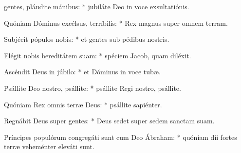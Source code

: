 \begin{psalmus}
    
     gentes, pláudite mánibus: * jubiláte Deo in voce exsultatiónis.
    
    Quóniam Dóminus excélsus, terríbilis: * Rex magnus super omnem terram.
    
    Subjécit pópulos nobis: * et gentes sub pédibus nostris.
    
    Elégit nobis hereditátem suam: * spéciem Jacob, quam diléxit.
    
    Ascéndit Deus in júbilo: * et Dóminus in voce tubæ.
    
    Psállite Deo nostro, psállite: * psállite Regi nostro, psállite.
    
    Quóniam Rex omnis terræ Deus: * psállite sapiénter.
    
    Regnábit Deus super gentes: * Deus sedet super sedem sanctam suam.
    
    Príncipes populórum congregáti sunt cum Deo Ábraham: * quóniam dii fortes terræ veheménter eleváti sunt.
    
    \end{psalmus}
